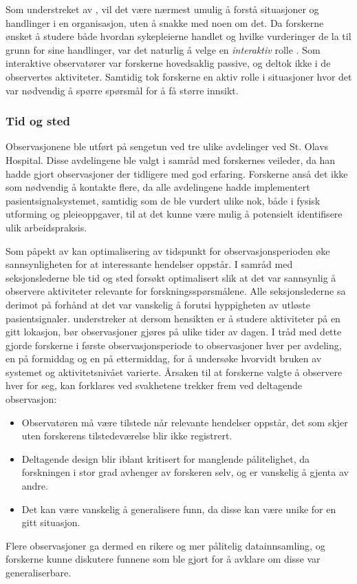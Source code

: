 \noindent
Som understreket av \citet{Myers13}, vil det være nærmest umulig å forstå situasjoner og handlinger i en organisasjon, uten å snakke med noen om det. Da forskerne ønsket å studere både hvordan sykepleierne handlet og hvilke vurderinger de la til grunn for sine handlinger, var det naturlig å velge en \textit{interaktiv} rolle \citep{Tjora}.  Som interaktive observatører var forskerne hovedsaklig passive, og deltok ikke i de observertes aktiviteter. Samtidig tok forskerne en aktiv rolle i situasjoner hvor det var nødvendig å spørre spørsmål for å få større innsikt.
 
\subsubsection{Tid og sted}
Observasjonene ble utført på sengetun ved tre ulike avdelinger ved St. Olavs Hospital. Disse avdelingene ble valgt i samråd med forskernes veileder, da han hadde gjort observasjoner der tidligere med god erfaring. Forskerne anså det ikke som nødvendig å kontakte flere, da alle avdelingene hadde implementert pasientsignalsystemet, samtidig som de ble vurdert ulike nok, både i fysisk utforming og pleieoppgaver, til at det kunne være mulig å potensielt identifisere ulik arbeidspraksis.
 
\noindent
Som påpekt av \citet{Millen00} kan optimalisering av tidspunkt for observasjonsperioden øke sannsynligheten for at interessante hendelser oppstår. I samråd med seksjonslederne ble tid og sted forsøkt optimalisert slik at det var sannsynlig å observere aktiviteter relevante for forskningsspørsmålene. Alle seksjonslederne sa derimot på forhånd at det var vanskelig å forutsi hyppigheten av utløste pasientsignaler. \citet{Blomberg93} understreker at dersom hensikten er å studere aktiviteter på en gitt lokasjon, bør observasjoner gjøres på ulike tider av dagen. I tråd med dette gjorde forskerne i første observasjonsperiode to observasjoner hver per avdeling, en på formiddag og en på ettermiddag, for å undersøke hvorvidt bruken av systemet og aktivitetsnivået varierte. Årsaken til at forskerne valgte å observere hver for seg, kan forklares ved svakhetene \citet{Oates} trekker frem ved deltagende observasjon: 
\begin{itemize}
\item Observatøren må være tilstede når relevante hendelser oppstår, det som skjer uten forskerens tilstedeværelse blir ikke registrert.
\item Deltagende design blir iblant kritisert for manglende pålitelighet, da forskningen i stor grad avhenger av forskeren selv, og er vanskelig å gjenta av andre.
\item Det kan være vanskelig å generalisere funn, da disse kan være unike for en gitt situasjon.
\end{itemize}
\noindent
Flere observasjoner ga dermed en rikere og mer pålitelig datainnsamling, og forskerne kunne diskutere funnene som ble gjort for å avklare om disse var generaliserbare.

